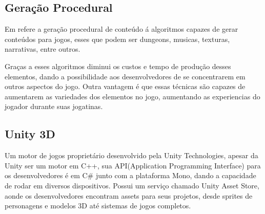 \subsection{Geração Procedural}
Em \cite{togelius2013procedural} refere a geração procedural de conteúdo á algoritmos capazes de gerar conteúdos para jogos, esses que podem ser dungeons, musicas, texturas, narrativas, entre outros.

Graças a esses algoritmos diminui os custos e tempo de produção desses elementos, dando a possibilidade aos desenvolvedores de se concentrarem em outros aspectos do jogo. Outra vantagem é que essas técnicas são capazes de aumentarem as variedades dos elementos no jogo, aumentando as experiencias do jogador durante suas jogatinas.

\subsection{Unity 3D}
Um motor de jogos proprietário desenvolvido pela Unity Technologies, apesar da Unity ser um motor em C++, sua API(Application Programming Interface) para os desenvolvedores é em C\# junto com a plataforma Mono, dando a capacidade de rodar em diversos dispositivos. Possui um serviço chamado Unity Asset Store, aonde os desenvolvedores encontram assets para seus projetos, desde sprites de personagens e modelos 3D até sistemas de jogos completos.